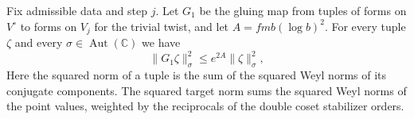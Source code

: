 \begin{lemma}
\label{lem:c-gluing-norm}
\emitthmsource
Fix admissible data and step $j$. Let $G_1$ be the gluing map from tuples of forms on $V^\circ$ to forms on $V_j$ for the trivial twist, and let $A=fmb(\log b)^2$. For every tuple $\zeta$ and every $\sigma\in\operatorname{Aut}(\mathbb C)$ we have
\[
  \|G_1\zeta\|_\sigma^2\le e^{2A}\|\zeta\|_\sigma^2,
\]
Here the squared norm of a tuple is the sum of the squared Weyl norms of its conjugate components. The squared target norm sums the squared Weyl norms of the point values, weighted by the reciprocals of the double coset stabilizer orders.
\end{lemma}

